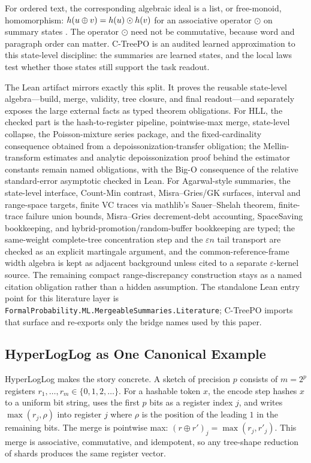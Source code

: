For ordered text, the corresponding algebraic ideal is a list, or free-monoid,
homomorphism: $h(u \oplus v) = h(u) \odot h(v)$ for an associative operator
$\odot$ on summary states \citep{Gibbons1996ThirdHomomorphism}. The operator
$\odot$ need not be commutative, because word and paragraph order can matter.
C-TreePO is an audited learned approximation to this state-level discipline:
the summaries are learned states, and the local laws test whether those states
still support the task readout.

The Lean artifact mirrors exactly this split. It proves the reusable
state-level algebra---build, merge, validity, tree closure, and final
readout---and separately exposes the large external facts as typed theorem
obligations. For HLL, the checked part is the hash-to-register pipeline,
pointwise-max merge, state-level collapse, the Poisson-mixture series package,
and the fixed-cardinality consequence obtained from a depoissonization-transfer
obligation; the Mellin-transform estimates and analytic depoissonization proof
behind the estimator constants remain named obligations, with the Big-O
consequence of the relative standard-error asymptotic checked in Lean. For
Agarwal-style summaries, the
state-level interface, Count-Min contrast, Misra--Gries/GK surfaces, interval
and range-space targets, finite VC traces via mathlib's
Sauer--Shelah theorem, finite-trace failure union bounds,
Misra--Gries decrement-debt accounting, SpaceSaving bookkeeping, and
hybrid-promotion/random-buffer bookkeeping are typed; the
same-weight complete-tree concentration step and the $\varepsilon n$ tail
transport are checked as an explicit martingale argument, and the
common-reference-frame width algebra is kept as adjacent background unless
cited to a separate $\varepsilon$-kernel source. The remaining compact
range-discrepancy construction stays as a named citation obligation rather
than a hidden assumption. The standalone Lean entry point for
this literature layer is
\texttt{FormalProbability.ML.MergeableSummaries.Literature}; C-TreePO imports
that surface and re-exports only the bridge names used by this paper.

\subsection{HyperLogLog as One Canonical Example}\label{sec:hll-primer}

HyperLogLog makes the story concrete. A sketch of precision $p$ consists of
$m = 2^p$ registers $r_1, \ldots, r_m \in \{0, 1, 2, \ldots\}$. For a
hashable token $x$, the encode step hashes $x$ to a uniform bit string,
uses the first $p$ bits as a register index $j$, and writes $\max(r_j, \rho)$
into register $j$ where $\rho$ is the position of the leading $1$ in the
remaining bits. The merge is pointwise max: $(r \oplus r')_j = \max(r_j, r'_j)$.
This merge is associative, commutative, and idempotent, so any tree-shape
reduction of shards produces the same register vector.

